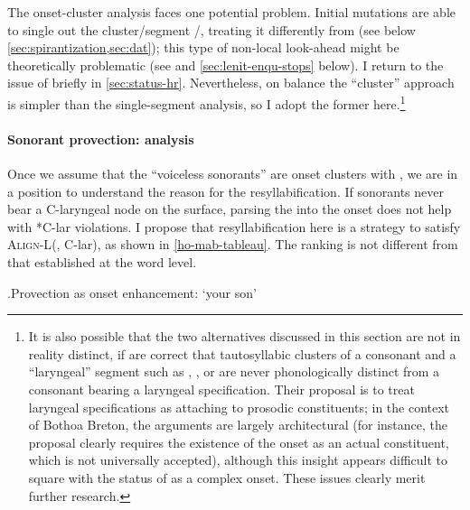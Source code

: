 The onset\hyp cluster analysis faces one potential problem. Initial mutations are able to single out the cluster\fshyp segment \ipa{[hr]}/\ipa{[r̥]}, treating it differently from \ipa{[h]} (see below \cref{sec:spirantization,sec:dat}); this type of non\hyp local look\hyp ahead might be theoretically problematic (see \citealt{buckley09:_local} and \cref{sec:lenit-enqu-stops} below). I return to the issue of \ipa{[r̥]} briefly in \cref{sec:status-hr}. Nevertheless, on balance the \enquote{cluster} approach is simpler than the single\hyp segment analysis, so I adopt the former here.\footnote{It is also possible that the two alternatives discussed in this section are not in reality distinct, if \citet{kehrein,kehrein04} are correct that tautosyllabic clusters of a consonant and a \enquote{laryngeal} segment such as \ipa{[h]}, \ipa{[ɦ]}, or \ipa{[ʔ]} are never phonologically distinct from a consonant bearing a laryngeal specification. Their proposal is to treat laryngeal specifications as attaching to prosodic constituents; in the context of Bothoa Breton, the arguments are largely architectural (for instance, the proposal clearly requires the existence of the onset as an actual constituent, which is not universally accepted), although this insight appears difficult to square with the status of \ipa{[hɥ]} as a complex onset. These issues clearly merit further research.}

\paragraph{Sonorant provection: analysis}
\label{sec:sonor-prov-analys}

Once we assume that the \enquote{voiceless sonorants} are onset clusters with \ipa{[h]}, we are in a position to understand the reason for the resyllabification. If sonorants never bear a C-laryngeal node on the surface, parsing the \ipa{[h]} into the onset does not help with *C-lar violations. I propose that resyllabification here is a strategy to satisfy \textsc{Align-L}(\sy, C-lar), as shown in \cref{ho-mab-tableau}. The ranking is not different from that established at the word level.

\ex.\label{ho-mab-tableau}Provection as onset enhancement: \ipa{[o ˈhmaːb̥]} `your son'\\


